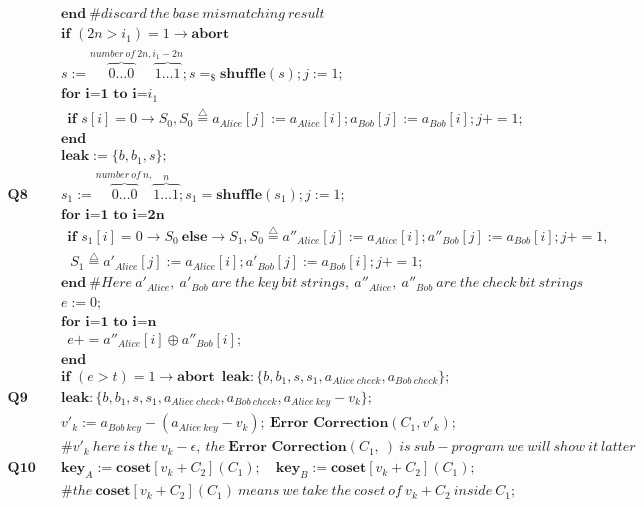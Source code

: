 \documentclass{report}
\theoremstyle{defn_style}
\begin{document}
\begin{tcolorbox}[colframe=black!75!black, colback=white, title=BB84 Protocol: Quantum Language Representation]
\begin{align*}
    &\textbf{end}~\#discard~the~base~mismatching~result\\
    & \textbf{if }  (2n>i_1) = 1 \rightarrow \textbf{abort} \; \\
    & s := \overset{number~of~2n,}{\overbrace{ 0\dots0}}\overset{i_1-2n}{\overbrace{1\dots1}}; s =_\$ \textbf{shuffle}(s); j:=1;\\
    &\textbf{for~i=1~to~i=$i_1$}\\
    &~~ \textbf{if }  s[i] = 0 \rightarrow S_0 ,S_0\stackrel{\triangle}{=}a_{Alice}[j]:=a_{Alice}[i];a_{Bob}[j]:=a_{Bob}[i];j+=1;\\
    &\textbf{end}\\
    &\textbf{leak}:={\{b,b_1,s\}};\\
    \textbf{Q8} \quad & s_1 := \overset{number~of~n,}{\overbrace{ 0\dots0}}\overset{n}{\overbrace{1\dots1}}; s_1 = \textbf{shuffle}(s_1);j:=1;\\
    &\textbf{for~i=1~to~i=2n}\\
    &~~ \textbf{if }  s_1[i] = 0 \rightarrow S_0~ \textbf{else} \rightarrow S_1 ,S_0\stackrel{\triangle}{=}a''_{Alice}[j]:=a_{Alice}[i];a''_{Bob}[j]:=a_{Bob}[i];j+=1,\\
    &~~~S_1\stackrel{\triangle}{=}a'_{Alice}[j]:=a_{Alice}[i];a'_{Bob}[j]:=a_{Bob}[i];j+=1;\\
    &\textbf{end}~\#Here~a'_{Alice},~a'_{Bob}~are~the~key~bit~strings,~a''_{Alice},~a''_{Bob}~are~the~check~bit~strings\\
    & e:=0;\\
    & \textbf{for~i=1~to~i=n}\\
    &~~ e += a''_{Alice}[i] \oplus a''_{Bob}[i];\\
    &\textbf{end}\\
    & \textbf{if }  (e>t) = 1 \rightarrow \textbf{abort} \;~\textbf{leak}:\{b,b_1,s,s_1,a_{Alice~check},a_{Bob~check}\};\\
    \textbf{Q9}  \quad &\textbf{leak}:\{b,b_1,s,s_1,a_{Alice~check},a_{Bob~check},a_{Alice~key}-v_k\};\\
    &v'_{k}:=a_{Bob~key}-(a_{Alice~key}-v_k);~ \textbf{Error~Correction}(C_1, v'_{k}); \\
    &\#v'_{k}~here~is~the~v_{k}-\epsilon,~the~\textbf{Error~Correction}(C_1, ~)~is~sub-program~we~will~show~it~latter\\
    \textbf{Q10} \quad & \textbf{key}_{A}:=\textbf{coset}[v_k + C_2](C_1); \quad \textbf{key}_B := \textbf{coset}[v_k + C_2](C_1);\\
    &\#the~\textbf{coset}[v_k + C_2](C_1)~means~we~take~the~coset~of~v_k + C_2~inside~C_1;
\end{align*}
\end{tcolorbox}
\end{document}
